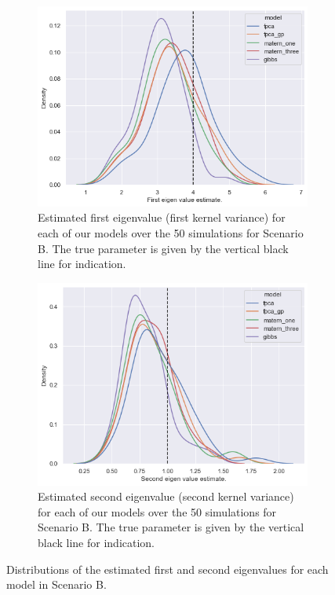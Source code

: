 \begin{figure}
	\centering
	\begin{subfigure}[b]{0.45\textwidth}
		\includegraphics[width=\textwidth]{lambda_1_param_B}
		\caption{Estimated first eigenvalue (first kernel variance) for each of our models over the 50 simulations for Scenario B. The true parameter is given by the vertical black line for indication.}
		\label{fig:lambda_1_param_B}
	\end{subfigure}
	\hfill
	\begin{subfigure}[b]{0.45\textwidth}
		\includegraphics[width=\textwidth]{lambda_2_param_B}
		\caption{Estimated second eigenvalue (second kernel variance) for each of our models over the 50 simulations for Scenario B. The true parameter is given by the vertical black line for indication.}
		\label{fig:lambda_2_param_B}
	\end{subfigure}
	\caption[Distributions of the estimated first and second eigenvalues for each model in Scenario B.]{Distributions of the estimated first and second eigenvalues for each model in Scenario B.}
	\label{fig:lambda_param_B}
\end{figure}

